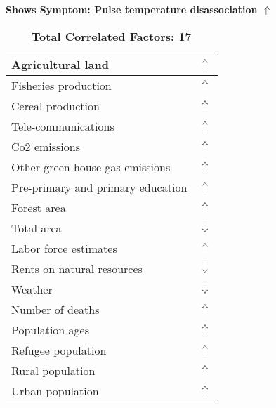 \documentclass[12pt,notitlepage,oneside]{report}
\begin{document}
\begin{table}[!htb]
\caption{\textbf{Shows Symptom: Pulse temperature disassociation $\Uparrow$}}
\centering
\label{Correlated Socio-economic Factors0}
\begin{tabular}{|l|l|}
\hline
Agricultural land & $\Uparrow$\\ \hline
Fisheries production & $\Uparrow$\\ \hline
Cereal production & $\Uparrow$\\ \hline
Tele-communications & $\Uparrow$\\ \hline
Co2 emissions & $\Uparrow$\\ \hline
Other green house gas emissions & $\Uparrow$\\ \hline
Pre-primary and primary education & $\Uparrow$\\ \hline
Forest area & $\Uparrow$\\ \hline
Total area & $\Downarrow$\\ \hline
Labor force estimates & $\Uparrow$\\ \hline
Rents on natural resources & $\Downarrow$\\ \hline
Weather & $\Downarrow$\\ \hline
Number of deaths & $\Uparrow$\\ \hline
Population ages & $\Uparrow$\\ \hline
Refugee population & $\Uparrow$\\ \hline
Rural population & $\Uparrow$\\ \hline
Urban population & $\Uparrow$\\ \hline
\end{tabular}
\caption*{\textbf{Total Correlated Factors: 17}}
\end{table}
\end{document}
